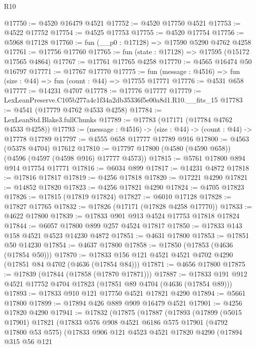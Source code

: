 \begin{lexlean}{R10}
\begin{coremodule}
@17750 := @4520 @16479 @4521
@17752 := @4520 @17750 @4521
@17753 := @4522 @17752
@17754 := @4525 @17753
@17755 := @4520 @17754
@17756 := @5968 @17128
@17760 := fun (__p0 : @17128) => @17590 @5290 @4762 @4258
@17761 := @17756 @17760
@17765 := fun (state : @17128) => @17595 (@15172 @17565 @4864)
@17767 := @17761 @17765 @4258
@17770 := @4565 @16474 @50 @16797
@17771 := @17767 @17770
@17775 := fun (message : @4516) => fun (size : @44) => fun (count : @44) => @17755 @17771
@17776 := @4531 @658
@17777 := @14231 @4707
@17778 := @17776 @17777
@17779 := LexLeanPreserve.C105b277a4c1f34a2db35336f5e00a8d1.R10.__fits_15
@17783 := @4541 (@17779 @4762 @4533 @4258)
@17784 := LexLeanStd.Blake3.fullChunks
@17789 := @17783 (@17171 (@17784 @4762 @4533 @4258))
@17793 := (message : @4516) -> (size : @44) -> (count : @44) -> @17778 @17789
@17797 := @4555 @658 @17777 @17789 @916
@17800 := @4563 (@5378 @4704) @17612
@17810 := @17797 @17800 (@4580 (@4590 @658)) (@4596 (@4597 (@4598 @916) @17777 @4573))
@17815 := @5761 @17800 @894 @914 @17754 @17771
@17816 := @6034 @899
@17817 := @14231 @4872
@17818 := @17816 @17817
@17819 := @4256 @17818
@17820 := @17221 @4290
@17821 := @14852 @17820
@17823 := @4256 @17821 @4290
@17824 := @4705 @17823
@17826 := @17815 (@17819 @17824)
@17827 := @6010 @17128
@17828 := @17827 @17765
@17832 := @17826 (@17171 (@17828 @4258 @17770))
@17833 := @4622 @17800
@17839 := @17833 @901 @913 @4524 @17753 @17818 @17824
@17844 := @6057 @17800 @899 @257 @4524 @17817
@17850 := @17833 @143 @158 @4521 @4523 @14230 @4872
@17851 := @4631 @17800
@17853 := @17851 @50 @14230
@17854 := @4637 @17800
@17858 := @17850 (@17853 (@4636 (@17854 @50)))
@17870 := @17833 @156 @121 @4521 @4521 @4702 @4290 (@17851 @84 @4702 (@4636 (@17854 @84)))
@17871 := @4656 @17800
@17875 := @17839 (@17844 (@17858 (@17870 @17871)))
@17887 := @17833 @191 @912 @4521 @17752 @4704 @17823 (@17851 @89 @4704 (@4636 (@17854 @89)))
@17893 := @17833 @910 @121 @17750 @4521 @17821 @4290
@17894 := @5661 @17800
@17899 := @17894 @426 @889 @909 @16479 @4521
@17901 := @4256 @17820 @4290
@17941 := @17832
    (@17875
      (@17887
        (@17893
          (@17899
            (@5015 @17901)
            @17821
            (@17833
              @576
              @908
              @4521
              @6186
              @575
              @17901
              (@4792 @17800 @53 @575)
              (@17833
                @906
                @121
                @4523
                @4521
                @17820
                @4290
                (@17894
                  @315
                  @56
                  @121

\end{coremodule}
\end{lexlean}
